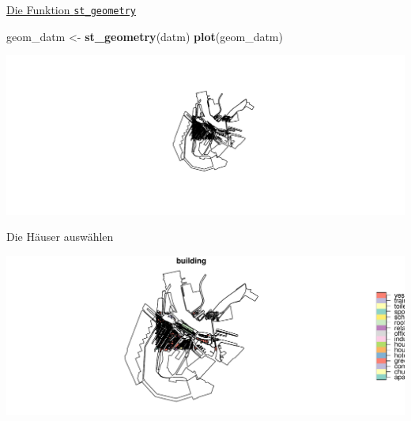 \documentclass[ignorenonframetext,]{beamer}
\newenvironment{Shaded}{\begin{snugshade}}{\end{snugshade}}
\newcommand{\KeywordTok}[1]{\textcolor[rgb]{0.13,0.29,0.53}{\textbf{#1}}}
\newcommand{\NormalTok}[1]{#1}
\newcommand{\OperatorTok}[1]{\textcolor[rgb]{0.81,0.36,0.00}{\textbf{#1}}}
\newcommand{\StringTok}[1]{\textcolor[rgb]{0.31,0.60,0.02}{#1}}
\begin{document}
\begin{frame}[fragile]{\href{https://cran.r-project.org/web/packages/sf/vignettes/sf3.html}{Die
Funktion \texttt{st\_geometry}}}
\protect\hypertarget{die-funktion-st_geometry}{}

\begin{Shaded}
\begin{Highlighting}[]
\NormalTok{geom_datm <-}\StringTok{ }\KeywordTok{st_geometry}\NormalTok{(datm)}
\KeywordTok{plot}\NormalTok{(geom_datm)}
\end{Highlighting}
\end{Shaded}

\includegraphics{simplefeatures_files/figure-beamer/unnamed-chunk-20-1.pdf}

\end{frame}

\begin{frame}[fragile]{Die Häuser auswählen}
\protect\hypertarget{die-hauser-auswahlen}{}

\begin{Shaded}
\end{Shaded}

\includegraphics{simplefeatures_files/figure-beamer/unnamed-chunk-21-1.pdf}

\end{frame}
\end{document}
